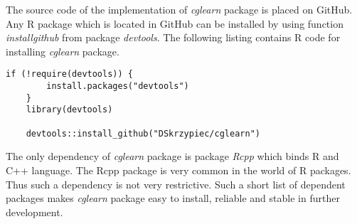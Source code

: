 %
%


The source code of the implementation of \textit{cglearn} package is placed on GitHub. 
Any R package which is located in GitHub can be installed by using function \textit{install\textunderscore github} from package \textit{devtools}.
The following listing contains R code for installing \textit{cglearn} package.

\begin{lstlisting}[caption={R code for installing \textit{cglearn} package.}]
	if (!require(devtools)) {
		install.packages("devtools")
	}	
	library(devtools)

	devtools::install_github("DSkrzypiec/cglearn")
\end{lstlisting}


The only dependency of \textit{cglearn} package is package \textit{Rcpp} which binds R and C++ language.
The Rcpp package is very common in the world of R packages. Thus such a dependency is not very restrictive. 
Such a short list of dependent packages makes \textit{cglearn} package easy to install, reliable and stable in further development.

